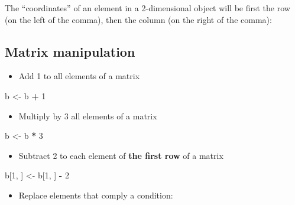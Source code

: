 \documentclass[]{book}
\newenvironment{Shaded}{\begin{snugshade}}{\end{snugshade}}
\newcommand{\DecValTok}[1]{\textcolor[rgb]{0.00,0.00,0.81}{#1}}
\newcommand{\NormalTok}[1]{#1}
\newcommand{\OperatorTok}[1]{\textcolor[rgb]{0.81,0.36,0.00}{\textbf{#1}}}
\newcommand{\StringTok}[1]{\textcolor[rgb]{0.31,0.60,0.02}{#1}}
\providecommand{\tightlist}{%
  \setlength{\itemsep}{0pt}\setlength{\parskip}{0pt}}
\begin{document}
The ``coordinates'' of an element in a 2-dimensional object will be first the row (on the left of the comma), then the column (on the right of the comma):

\hypertarget{matrix-manipulation}{%
\subsection{Matrix manipulation}\label{matrix-manipulation}}

\begin{itemize}
\tightlist
\item
  Add 1 to all elements of a matrix
\end{itemize}

\begin{Shaded}
\begin{Highlighting}[]
\NormalTok{b <-}\StringTok{ }\NormalTok{b }\OperatorTok{+}\StringTok{ }\DecValTok{1}
\end{Highlighting}
\end{Shaded}

\begin{itemize}
\tightlist
\item
  Multiply by 3 all elements of a matrix
\end{itemize}

\begin{Shaded}
\begin{Highlighting}[]
\NormalTok{b <-}\StringTok{ }\NormalTok{b }\OperatorTok{*}\StringTok{ }\DecValTok{3}
\end{Highlighting}
\end{Shaded}

\begin{itemize}
\tightlist
\item
  Subtract 2 to each element of \textbf{the first row} of a matrix
\end{itemize}

\begin{Shaded}
\begin{Highlighting}[]
\NormalTok{b[}\DecValTok{1}\NormalTok{, ] <-}\StringTok{ }\NormalTok{b[}\DecValTok{1}\NormalTok{, ] }\OperatorTok{-}\StringTok{ }\DecValTok{2}
\end{Highlighting}
\end{Shaded}

\begin{itemize}
\tightlist
\item
  Replace elements that comply a condition:
\end{itemize}
\end{document}
